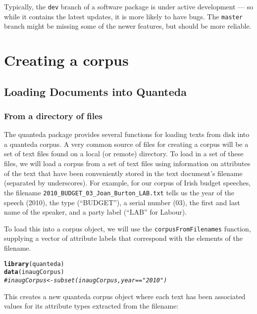 \documentclass[11pt]{article}\usepackage[]{graphicx}\usepackage[]{color}
\makeatletter
\newcommand{\hlcom}[1]{\textcolor[rgb]{0.678,0.584,0.686}{\textit{#1}}}%
\newcommand{\hlstd}[1]{\textcolor[rgb]{0.345,0.345,0.345}{#1}}%
\newcommand{\hlkwd}[1]{\textcolor[rgb]{0.737,0.353,0.396}{\textbf{#1}}}%
\newenvironment{kframe}{%
 \def\at@end@of@kframe{}%
 \ifinner\ifhmode%
  \def\at@end@of@kframe{\end{minipage}}%
  \begin{minipage}{\columnwidth}%
 \fi\fi%
 \def\FrameCommand##1{\hskip\@totalleftmargin \hskip-\fboxsep
 \colorbox{shadecolor}{##1}\hskip-\fboxsep
     \hskip-\linewidth \hskip-\@totalleftmargin \hskip\columnwidth}%
 \MakeFramed {\advance\hsize-\width
   \@totalleftmargin\z@ \linewidth\hsize
   \@setminipage}}%
 {\par\unskip\endMakeFramed%
 \at@end@of@kframe}
\newenvironment{knitrout}{}{} %
\makeatother
\begin{document}
Typically, the \texttt{dev} branch of a software package is under active development --- so while it contains the latest updates, it is more likely to have bugs. The \texttt{master} branch might be missing some of the newer features, but should be more reliable.

\section{Creating a corpus}

\subsection{Loading Documents into Quanteda}

\subsubsection{From a directory of files}

The quanteda package provides several functions for loading
texts from disk into a quanteda corpus.
A very common source of files for creating a corpus will be a set of
text files found on a local (or remote) directory.  To load in a set
of these files, we will load a corpus from a set of text files using
information on attributes of the text that have been conveniently
stored in the text document's filename (separated by underscores).
For example, for our corpus of Irish budget speeches, the filename
\texttt{2010\_BUDGET\_03\_Joan\_Burton\_LAB.txt} tells us the year of
the speech (2010), the type (``BUDGET''), a serial number (03), the
first and last name of the speaker, and a party label (``LAB'' for
Labour).

To load this into a corpus object, we will use the
\texttt{corpusFromFilenames} function, supplying a vector of attribute
labels that correspond with the elements of the filename.

\begin{knitrout}\footnotesize
{}\color{fgcolor}\begin{kframe}
\begin{alltt}
\hlkwd{library}\hlstd{(quanteda)}
\hlkwd{data}\hlstd{(inaugCorpus)}
\hlcom{# inaugCorpus <- subset(inaugCorpus, year=="2010")}
\end{alltt}
\end{kframe}
\end{knitrout}

This creates a new quanteda corpus object where each text has been associated values for its attribute types extracted from the filename:
\end{document}
